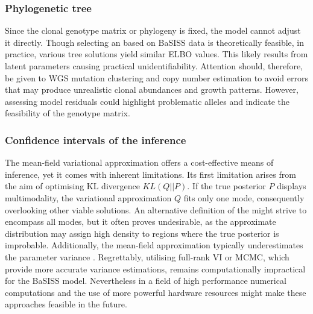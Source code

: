 \subsubsection*{Phylogenetic tree}
Since the clonal genotype matrix or phylogeny is fixed, the model cannot adjust it directly. Though selecting an  based on BaSISS data is theoretically feasible, in practice, various tree solutions yield similar \ac{ELBO} values. This likely results from latent parameters causing practical unidentifiability. Attention should, therefore, be given to \ac{WGS} mutation clustering and copy number estimation to avoid errors that may produce unrealistic clonal abundances and growth patterns. However, assessing model residuals could highlight problematic alleles and indicate the feasibility of the genotype matrix.

\subsubsection*{Confidence intervals of the inference}

The mean-field variational approximation offers a cost-effective means of inference, yet it comes with inherent limitations. Its first limitation arises from the aim of optimising KL divergence $KL(Q||P)$. If the true posterior $P$ displays multimodality, the variational approximation $Q$ fits only one mode, consequently overlooking other viable solutions. An alternative definition of the  might strive to encompass all modes, but it often proves undesirable, as the approximate distribution may assign high density to regions where the true posterior is improbable. Additionally, the mean-field approximation typically underestimates the parameter variance \parencite{Kucukelbir2016-gn}. Regrettably, utilising full-rank \ac{VI} or \ac{MCMC}, which provide more accurate variance estimations, remains computationally impractical for the \ac{BaSISS} model. Nevertheless  in a field of high performance numerical computations and the use of more powerful hardware resources might make these approaches feasible in the future. 